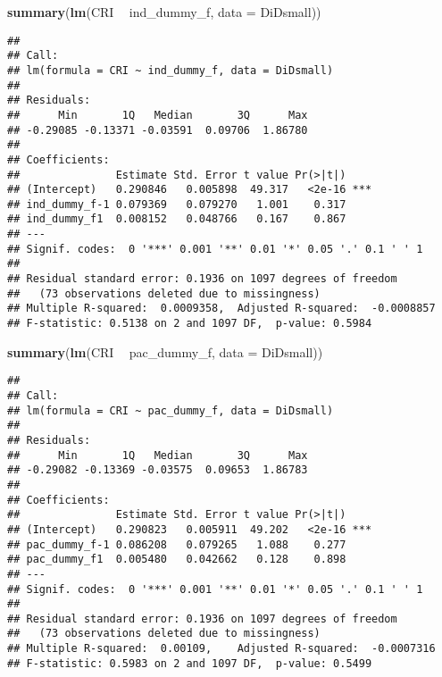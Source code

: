\documentclass[]{article}
\newenvironment{Shaded}{\begin{snugshade}}{\end{snugshade}}
\newcommand{\KeywordTok}[1]{\textcolor[rgb]{0.13,0.29,0.53}{\textbf{#1}}}
\newcommand{\DataTypeTok}[1]{\textcolor[rgb]{0.13,0.29,0.53}{#1}}
\newcommand{\StringTok}[1]{\textcolor[rgb]{0.31,0.60,0.02}{#1}}
\newcommand{\OperatorTok}[1]{\textcolor[rgb]{0.81,0.36,0.00}{\textbf{#1}}}
\newcommand{\NormalTok}[1]{#1}
\begin{document}
\begin{Shaded}
\begin{Highlighting}[]
\KeywordTok{summary}\NormalTok{(}\KeywordTok{lm}\NormalTok{(CRI }\OperatorTok{~}\StringTok{ }\NormalTok{ind_dummy_f, }\DataTypeTok{data =}\NormalTok{ DiDsmall))}
\end{Highlighting}
\end{Shaded}

\begin{verbatim}
## 
## Call:
## lm(formula = CRI ~ ind_dummy_f, data = DiDsmall)
## 
## Residuals:
##      Min       1Q   Median       3Q      Max 
## -0.29085 -0.13371 -0.03591  0.09706  1.86780 
## 
## Coefficients:
##               Estimate Std. Error t value Pr(>|t|)    
## (Intercept)   0.290846   0.005898  49.317   <2e-16 ***
## ind_dummy_f-1 0.079369   0.079270   1.001    0.317    
## ind_dummy_f1  0.008152   0.048766   0.167    0.867    
## ---
## Signif. codes:  0 '***' 0.001 '**' 0.01 '*' 0.05 '.' 0.1 ' ' 1
## 
## Residual standard error: 0.1936 on 1097 degrees of freedom
##   (73 observations deleted due to missingness)
## Multiple R-squared:  0.0009358,  Adjusted R-squared:  -0.0008857 
## F-statistic: 0.5138 on 2 and 1097 DF,  p-value: 0.5984
\end{verbatim}

\begin{Shaded}
\begin{Highlighting}[]
\KeywordTok{summary}\NormalTok{(}\KeywordTok{lm}\NormalTok{(CRI }\OperatorTok{~}\StringTok{ }\NormalTok{pac_dummy_f, }\DataTypeTok{data =}\NormalTok{ DiDsmall))}
\end{Highlighting}
\end{Shaded}

\begin{verbatim}
## 
## Call:
## lm(formula = CRI ~ pac_dummy_f, data = DiDsmall)
## 
## Residuals:
##      Min       1Q   Median       3Q      Max 
## -0.29082 -0.13369 -0.03575  0.09653  1.86783 
## 
## Coefficients:
##               Estimate Std. Error t value Pr(>|t|)    
## (Intercept)   0.290823   0.005911  49.202   <2e-16 ***
## pac_dummy_f-1 0.086208   0.079265   1.088    0.277    
## pac_dummy_f1  0.005480   0.042662   0.128    0.898    
## ---
## Signif. codes:  0 '***' 0.001 '**' 0.01 '*' 0.05 '.' 0.1 ' ' 1
## 
## Residual standard error: 0.1936 on 1097 degrees of freedom
##   (73 observations deleted due to missingness)
## Multiple R-squared:  0.00109,    Adjusted R-squared:  -0.0007316 
## F-statistic: 0.5983 on 2 and 1097 DF,  p-value: 0.5499
\end{verbatim}
\end{document}

